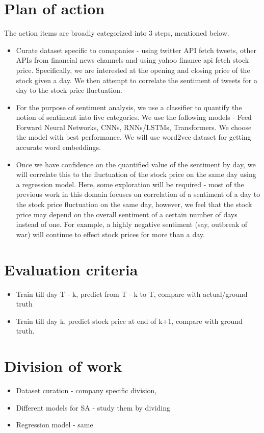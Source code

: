 \documentclass{article}
\begin{document}
\section{Plan of action}
The action items are broadly categorized into 3 steps, mentioned below.
\begin{itemize}
    \item Curate dataset specific to comapanies - using twitter API fetch tweets, other APIs from financial news channels and using yahoo finance api fetch stock price. Specifically, we are interested at the opening and closing price of the stock given a day. We then attempt to correlate the sentiment of tweets for a day to the stock price fluctuation.
    \item For the purpose of sentiment analysis, we use a classifier to quantify the notion of sentiment into five categories. We use the following models - Feed Forward Neural Networks, CNNs, RNNs/LSTMs, Transformers. We choose the model with best performance. We will use word2vec dataset for getting accurate word embeddings.
    \item Once we have confidence on the quantified value of the sentiment by day, we will correlate this to the fluctuation of the stock price on the same day using a regression model. Here, some exploration will be required - most of the previous work in this domain focuses on correlation of a sentiment of a day to the stock price fluctuation on the same day, however, we feel that the stock price may depend on the overall sentiment of a certain number of days instead of one. For example, a highly negative sentiment (say, outbreak of war) will continue to effect stock prices for more than a day.
\end{itemize}

\section{Evaluation criteria}
\begin{itemize}
    \item Train till day T - k, predict from T - k to T, compare with actual/ground truth
    \item Train till day k, predict stock price at end of k+1, compare with ground truth.
\end{itemize}

\section{Division of work}
\begin{itemize}
    \item Dataset curation - company specific division, 
    \item Different models for SA - study them by dividing
    \item Regression model - same
\end{itemize}
\end{document}

